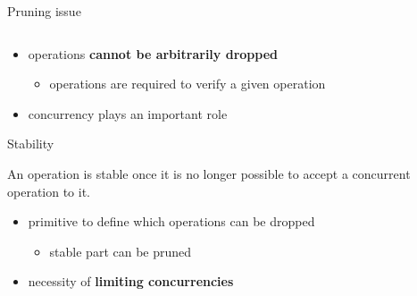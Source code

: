 \documentclass[xcolor=table]{beamer}
\newenvironment{utikzhbgraph}{%
    \newcommand{\uevent}[3]{\node[event] (##1) at (##2) {};\node[] at (##1) {##3};}%
    \newcommand{\uhb}[2]{\draw[precedes] (##1) to (##2);}%
    \newcommand{\ulabelled}[2]{\node[ulabel,below left=-1pt and -4pt of ##1] (l##1) {};\node[] at (l##1) {##2};}%
    \newcommand{\uembedded}[3]{%
        \node[##2=-7.5pt and -7.5pt of ##1] (uembeddedp0##1) {};%
        \node[##2=10pt and 1pt of ##1] (uembeddedp1##1) {};%
        \draw[-Circle] (uembeddedp1##1) to (uembeddedp0##1);%
        \node[##2=-10pt and -7pt of uembeddedp1##1] {##3};}%
    \newcommand{\uparticipants}[3]{\uembedded{##1}{##2}{$\left\{##3\right\}$}}%
    \begin{tikzpicture}%
}{%
    \end{tikzpicture}%
}
\begin{document}
\begin{frame}{Pruning issue}
\begin{columns}
    \end{columns}
    \begin{itemize}
        \item operations \textbf{cannot be arbitrarily dropped}
        \begin{itemize}
            \item operations are required to verify a given operation
        \end{itemize}
        \item concurrency plays an important role
    \end{itemize}
\end{frame}

\begin{frame}{Stability}
    \begin{definition}
        An operation is stable once it is no longer possible to accept a concurrent operation to it.
    \end{definition}
    \begin{itemize}
        \item primitive to define which operations can be dropped
        \begin{itemize}
            \item stable part can be pruned
        \end{itemize}
        \item necessity of \textbf{limiting concurrencies}
    \end{itemize}
\end{frame}
\end{document}
